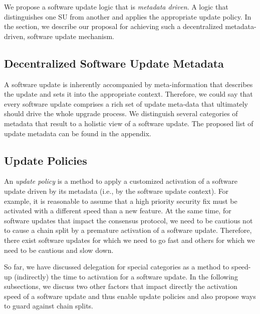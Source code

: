 We propose a software update logic that is \emph{metadata driven}. A logic that distinguishes one SU from another and applies the appropriate update policy. In the section, we describe our proposal for achieving such a decentralized metadata-driven, software update mechanism.

\subsection{Decentralized Software Update Metadata} 
A software update is inherently accompanied by meta-information that describes the update and sets it into the appropriate context. Therefore, we could say that every software update comprises a rich set of update meta-data that ultimately should drive the whole upgrade process. We distinguish several categories of metadata that result to a holistic view of a software update. The proposed list of update metadata can be found in the appendix. %


\subsection{Update Policies} 
An \emph{update policy} is a method to apply a customized activation of a software update driven by its metadata (i.e., by the software update context). For example, it is reasonable to assume that a high priority security fix must be activated with a different speed than a  new feature. At the same time, for software updates that impact the consensus protocol, we need to be cautious not to cause a chain split by a premature activation of a software update. Therefore, there exist software updates for which we need to go fast and others for which we need to be cautious and slow down.

So far, we have discussed delegation for special categories as a method to speed-up (indirectly) the time to activation for a software update. In the following subsections, we discuss two other factors that impact directly the activation speed of a software update and thus enable update policies and also propose ways to guard against chain splits.
 

